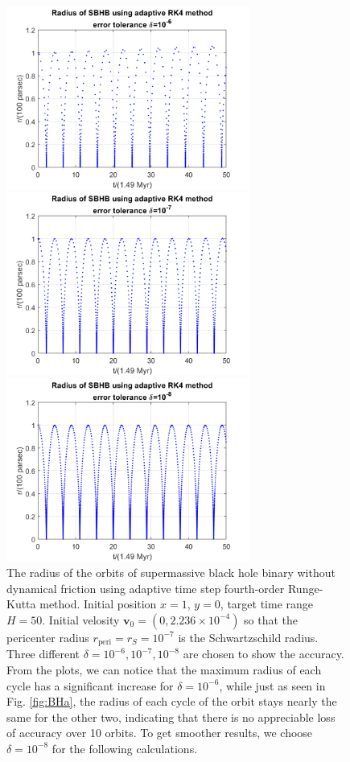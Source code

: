 \documentclass[12pt, graphicx]{article}
\begin{document}
\begin{figure}[ht]
\begin{minipage}{0.48\linewidth}
\centering
\includegraphics[width = 80mm]{BH_a6r.png}
\end{minipage}
\begin{minipage}{0.48\linewidth}
\centering
\includegraphics[width = 80mm]{BH_a7r.png}
\end{minipage}
\centering
\begin{minipage}{0.48\linewidth}
\centering
\includegraphics[width = 80mm]{BH_a8r.png}
\end{minipage}
\caption{The radius of the orbits of supermassive black hole binary without dynamical friction using adaptive time step fourth-order Runge-Kutta method. Initial position $x=1$, $y=0$, target time range $H=50$. Initial velosity $\mathbf{v}_0=(0,2.236\times10^{-4})$ so that the pericenter radius $r_\mathrm{peri}=r_S=10^{-7}$ is the Schwartzschild radius. Three different  $\delta=10^{-6}, 10^{-7}, 10^{-8}$ are chosen to show the accuracy. From the plots, we can notice that the maximum radius of each cycle has a significant increase for $\delta=10^{-6}$, while just as seen in Fig. \ref{fig:BHa}, the radius of each cycle of the orbit stays nearly the same for the other two, indicating that there is no appreciable loss of accuracy over 10 orbits. To get smoother results, we choose $\delta=10^{-8}$ for the following calculations.}
\label{fig:BHar}
\end{figure}
\end{document}
